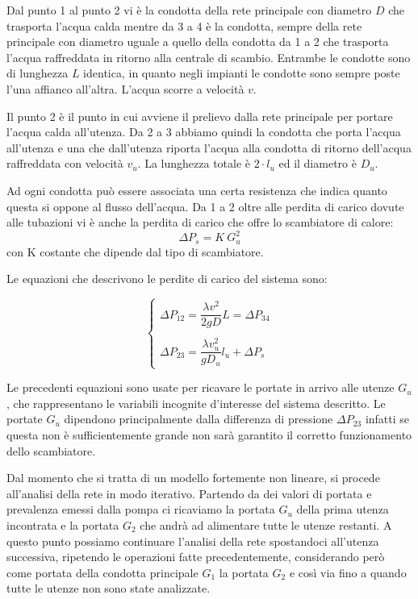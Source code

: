 \documentclass[laurea,oneside,11pt]{USiena_tesiLM}
\begin{document}
Dal punto 1 al punto 2 vi è la condotta della rete principale con diametro $D$ che trasporta l'acqua calda mentre da 3 a 4 è la condotta, sempre della rete principale con diametro uguale a quello della condotta da 1 a 2 che trasporta l'acqua raffreddata in ritorno alla centrale di scambio. Entrambe le  condotte sono di lunghezza $L$ identica, in quanto negli impianti le condotte sono sempre poste l'una affianco all'altra. L'acqua scorre a velocità $v$.

Il punto 2 è il punto in cui avviene il prelievo dalla rete principale per portare l'acqua calda all'utenza. Da 2 a 3 abbiamo quindi la condotta che porta l'acqua all'utenza e una che dall'utenza riporta l'acqua alla condotta di ritorno dell'acqua raffreddata con velocità $v_u$. La lunghezza totale è $2 \cdot l_u$ ed il diametro è $D_u$.

Ad ogni condotta può essere associata una certa resistenza che  indica quanto questa si oppone al flusso dell'acqua. Da 1 a 2 oltre alle perdita di carico dovute alle tubazioni vi è anche la perdita di carico che offre lo scambiatore di calore:
\begin{equation}
\Delta P_s = K \ G^2_u
\end{equation}
con K costante che dipende dal tipo di scambiatore.

Le equazioni che descrivono le perdite di carico del sistema sono:

\begin{equation}
\begin{cases}
\Delta P_{12} = \dfrac{\lambda v^2}{2 g D} L = \Delta P_{34} \\
\\
\Delta P_{23} = \dfrac{\lambda v_u^2}{ g D_u} l_u + \Delta P_s
\end{cases}
\end{equation}

Le precedenti equazioni sono usate per ricavare le portate in arrivo alle utenze $G_u$, che rappresentano le variabili incognite d'interesse del sistema descritto. Le portate $G_u$ dipendono principalmente dalla differenza di pressione $\Delta P_{23}$ infatti se questa non è sufficientemente grande non sarà garantito il corretto funzionamento dello scambiatore.

Dal momento che si tratta di un modello fortemente non lineare, si procede all'analisi della rete in modo iterativo. Partendo da dei valori di portata e prevalenza emessi dalla pompa ci ricaviamo la portata $G_u$ della prima utenza incontrata e la portata $G_2$ che andrà ad alimentare tutte le utenze restanti. A questo punto possiamo continuare l'analisi della rete spostandoci all'utenza successiva, ripetendo le operazioni fatte precedentemente, considerando però come portata della condotta principale $G_1$ la portata $G_2$ e così via fino a quando tutte le utenze non sono state analizzate.
\end{document}
